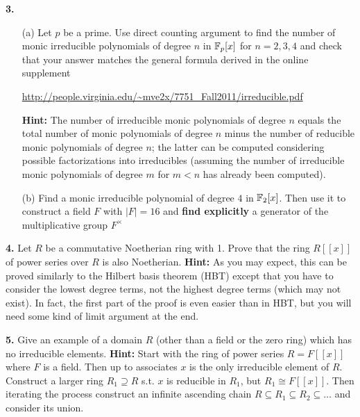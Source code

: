 \documentclass[12pt]{amsart}
\begin{document}
{\bf 3.}\begin{itemize} 
\item[(a)] Let $p$ be a prime. Use direct counting argument to find the number
of monic irreducible polynomials of degree $n$ in ${\mathbb F}_p[x]$ for $n=2,3,4$ and
check that your answer matches the general formula derived in the online supplement
\skv
\centerline{\url{http://people.virginia.edu/~mve2x/7751_Fall2011/irreducible.pdf}}
\skv
{\bf Hint:} The number of irreducible monic polynomials of degree $n$ equals
the total number of monic polynomials of degree $n$ minus the number
of reducible monic polynomials of degree $n$; the latter can be computed
considering possible factorizations into irreducibles (assuming the number of 
irreducible monic polynomials of degree $m$ for $m<n$ has already been computed).
\item[(b)] Find a monic irreducible polynomial of degree $4$ in ${\mathbb F}_2[x]$.
Then use it to construct a field $F$ with $|F|=16$ and {\bf find explicitly}
a generator of the multiplicative group $F^{\times}$
\end{itemize}
\skv
{\bf 4.} Let $R$ be a commutative Noetherian ring with 1. Prove that
the ring $R[[x]]$ of power series over $R$ is also Noetherian.
{\bf Hint:} As you may expect, this can be proved similarly 
to the Hilbert basis theorem (HBT) except that you have to consider
the lowest degree terms, not the highest degree terms (which may not exist). 
In fact, the first part of the proof is even easier than in HBT, but you will 
need some kind of limit argument at the end.


\skv
{\bf 5.} Give an example of a domain $R$ (other than a field or
the zero ring) which has no irreducible elements. {\bf Hint:}
Start with the ring of power series $R=F[[x]]$ where $F$ is a field.
Then up to associates $x$ is the only irreducible element of $R$.
Construct a larger ring $R_1\supseteq R$ s.t. $x$ is reducible in $R_1$, but
$R_1\cong F[[x]]$. Then iterating the process construct
an infinite ascending chain $R\subseteq R_1\subseteq R_2\subseteq \ldots$ and consider its union.
\end{document}
